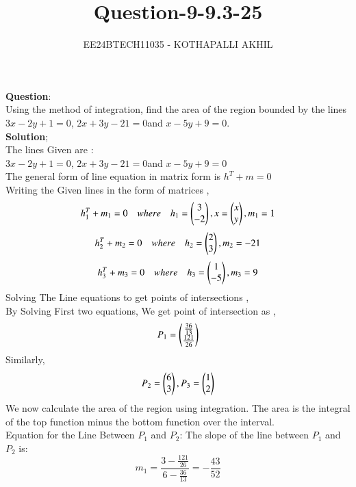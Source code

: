 \documentclass[journal]{IEEEtran}
\begin{document}

\title{Question-9-9.3-25}
\author{EE24BTECH11035 - KOTHAPALLI AKHIL}
{\let\newpage\relax\maketitle}
\vspace{-10mm}
\textbf{Question}:\\
Using the method of integration, find the area of the region bounded by the lines
$3x-2y+1=0$, $2x+3y-21=0$and $x-5y+9=0$.\\
\textbf{Solution};\\
   The lines Given are :\\
   $3x-2y+1=0$, $2x+3y-21=0$and $x-5y+9=0$\\
   The general form of line equation in matrix form is $h^T+m=0$\\
   Writing the Given lines in the form of matrices ,
   \begin{equation}
     h_1^T+m_1=0 \quad  where\quad  h_1=\begin{pmatrix}3\\-2\end{pmatrix} , x=\begin{pmatrix}x\\y\end{pmatrix} , m_1=1  
   \end{equation}
   \begin{equation}
         h_2^T+m_2=0\quad   where \quad  h_2=\begin{pmatrix}2\\3\end{pmatrix} , m_2=-21 
   \end{equation}
   \begin{equation}
        h_3^T+m_3=0  \quad where\quad  h_3=\begin{pmatrix}1\\-5\end{pmatrix} , m_3=9 
   \end{equation}
   Solving The Line equations to get points of intersections ,\\
   By Solving First two equations, We get point of intersection as ,
   \begin{equation}
       P_1=\begin{pmatrix}\frac{36}{13} \\ \frac{121}{26}\end{pmatrix}
   \end{equation}
Similarly, 
\begin{equation}
     P_2=\begin{pmatrix}6\\3\end{pmatrix} ,
     P_3=\begin{pmatrix}1\\2\end{pmatrix}
\end{equation}
We now calculate the area of the region using integration. The area is the integral of the top function minus the bottom function over the interval.\\
Equation for the Line Between $P_1$ and $P_2$:
The slope of the line between $P_1$ and $P_2$ is:
\begin{equation}
m_1 = \frac{3 - \frac{121}{26}}{6 - \frac{36}{13}} = -\frac{43}{52}
\end{equation}
\end{document}

